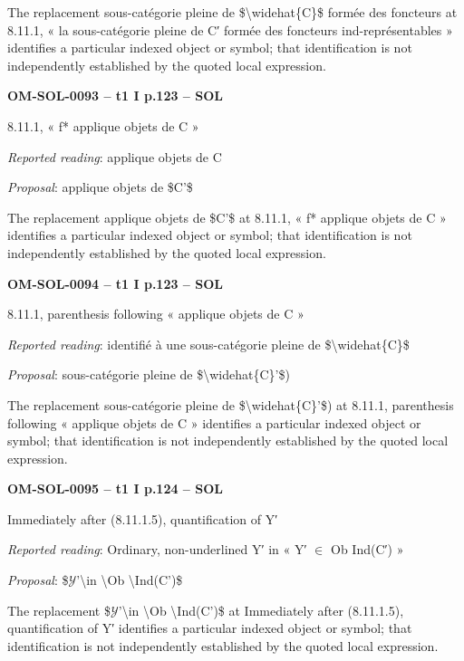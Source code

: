 The replacement sous-catégorie pleine de \$\textbackslash{}widehat\{C\}\$ formée des foncteurs at 8.11.1, « la sous-catégorie pleine de C′ formée des foncteurs ind-représentables » identifies a particular indexed object or symbol; that identification is not independently established by the quoted local expression.\par
\par\noindent\textbf{OM-SOL-0093 -- t1 I p.123 -- SOL}\par
8.11.1, « f* applique objets de C »\par
\emph{Reported reading}: applique objets de C\par
\emph{Proposal}: applique objets de \$C'\$\par
The replacement applique objets de \$C'\$ at 8.11.1, « f* applique objets de C » identifies a particular indexed object or symbol; that identification is not independently established by the quoted local expression.\par
\par\noindent\textbf{OM-SOL-0094 -- t1 I p.123 -- SOL}\par
8.11.1, parenthesis following « applique objets de C »\par
\emph{Reported reading}: identifié à une sous-catégorie pleine de \$\textbackslash{}widehat\{C\}\$\par
\emph{Proposal}: sous-catégorie pleine de \$\textbackslash{}widehat\{C\}'\$)\par
The replacement sous-catégorie pleine de \$\textbackslash{}widehat\{C\}'\$) at 8.11.1, parenthesis following « applique objets de C » identifies a particular indexed object or symbol; that identification is not independently established by the quoted local expression.\par
\par\noindent\textbf{OM-SOL-0095 -- t1 I p.124 -- SOL}\par
Immediately after (8.11.1.5), quantification of Y′\par
\emph{Reported reading}: Ordinary, non-underlined Y′ in « Y′ \ensuremath{\in} Ob Ind(C′) »\par
\emph{Proposal}: \$\ensuremath{𝒴}'\textbackslash{}in \textbackslash{}Ob \textbackslash{}Ind(C')\$\par
The replacement \$\ensuremath{𝒴}'\textbackslash{}in \textbackslash{}Ob \textbackslash{}Ind(C')\$ at Immediately after (8.11.1.5), quantification of Y′ identifies a particular indexed object or symbol; that identification is not independently established by the quoted local expression.\par
